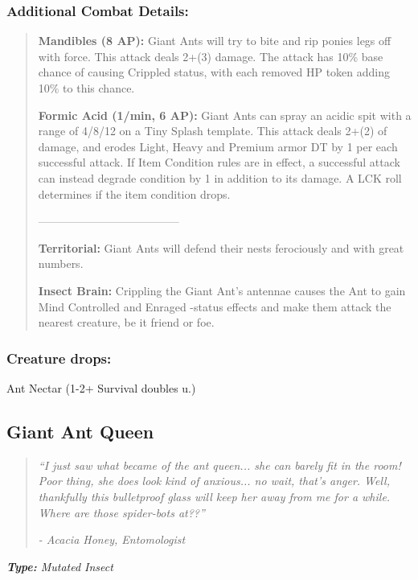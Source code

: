 \documentclass[11pt,a4paper,twocolumn]{book}
\begin{document}
	\subsubsection*{Additional Combat Details:}
	\begin{verse}
		\textbf{Mandibles (8 AP):} Giant Ants will try to bite and rip ponies legs off with force. This attack deals 2+(3) damage. The attack has 10\% base chance of causing Crippled status, with each removed HP token adding 10\% to this chance.
		
		\textbf{Formic Acid (1/min, 6 AP):} Giant Ants can spray an acidic spit with a range of 4/8/12 on a Tiny Splash template. This attack deals 2+(2) of damage, and erodes Light, Heavy and Premium armor DT by 1 per each successful attack. If Item Condition rules are in effect, a successful attack can instead degrade condition by 1 in addition to its damage. A LCK roll determines if the item condition drops.
		
		--------------------------------------
		
		\textbf{Territorial:} Giant Ants will defend their nests ferociously and with great numbers.
		
		\textbf{Insect Brain:} Crippling the Giant Ant's antennae causes the Ant to gain Mind Controlled and Enraged -status effects and make them attack the nearest creature, be it friend or foe.
		
	\end{verse}
	
	\subsubsection*{Creature drops:}
	Ant Nectar (1-2+ Survival doubles u.)
	
	\vfill	
	\subsection*{Giant Ant Queen}
	\begin{quote}
		\emph{``I just saw what became of the ant queen... she can barely fit in the room! Poor thing, she does look kind of anxious... no wait, that's anger. Well, thankfully this bulletproof glass will keep her away from me for a while. Where are those spider-bots at??''}
		
		\emph{-	Acacia Honey, Entomologist}
	\end{quote}
	
	\emph{\textbf{Type:} Mutated Insect}
	
\end{document}
